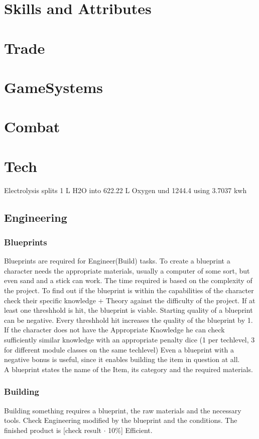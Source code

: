 \chapter{Skills and Attributes}\label{ch:skillsandattributes}


\chapter{Trade}\label{ch:trade}



\chapter{GameSystems}\label{ch:gamesystems}



\chapter{Combat}\label{ch:combat}


\chapter{Tech}\label{ch:tech}
Electrolysis splits 1 L H2O into 622.22 L Oxygen und 1244.4 using 3.7037 kwh\\
\section{Engineering}\label{sec:engineering}
\subsection{Blueprints}\label{subsec:blueprints}
Blueprints are required for Engineer(Build) tasks.
To create a blueprint a character needs the appropriate materials, usually a computer of some sort, but even sand and a
stick can work.
The time required is based on the complexity of the project.
To find out if the blueprint is within the capabilities of the character check their specific knowledge + Theory
against the difficulty of the project.
If at least one threshhold is hit, the blueprint is viable.
Starting quality of a blueprint can be negative.
Every threshhold hit increases the quality of the blueprint by 1.
If the character does not have the Appropriate Knowledge he can check sufficiently similar knowledge with
an appropriate penalty dice (1 per techlevel, 3 for different module classes on the same techlevel)
Even a blueprint with a negative bonus is useful, since it enables building the item in question at all.\\
A blueprint states the name of the Item, its category and the required materials.

\subsection{Building}\label{subsec:building}
Building something requires a blueprint, the raw materials and the necessary tools.
Check Engineering modified by the blueprint and the conditions.
The finished product is [check result \(\cdot\) 10\%] Efficient.
